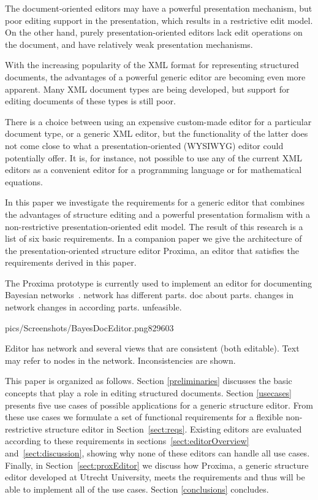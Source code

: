 \documentclass{speauth}
\begin{document}

The document-oriented editors may have a powerful presentation mechanism, but poor editing support in the presentation, which results in a restrictive edit model. On the other hand,  purely presentation-oriented editors lack edit operations on the document, and have relatively weak presentation mechanisms.

With the increasing popularity of the XML format for representing structured documents, the advantages of a powerful generic editor are becoming even more apparent. Many XML document types are being developed, but support for editing documents of these types is still poor. 

There is a choice between using an expensive custom-made editor for a particular document type, or a generic XML editor, but the functionality of the latter does not come close to what a presentation-oriented (WYSIWYG) editor could potentially offer. It is, for instance, not possible to use any of the current XML editors as a convenient editor for a programming language or for mathematical equations.

In this paper we investigate the requirements for a generic editor that combines the advantages of structure editing and a powerful presentation formalism with a non-restrictive presentation-oriented edit model. The result of this research is a list of six basic requirements. In a companion paper we give the architecture of the presentation-oriented structure editor Proxima, an editor that satisfies  the requirements derived in this paper.

The Proxima prototype is currently used to implement an editor for documenting Bayesian networks~\cite{Jensen2001BayesianNetworks}. 
network has different parts. doc about parts. changes in network changes in according parts. unfeasible.



          {pics/Screenshots/BayesDocEditor.png}{829}{603}





Editor has network and several views that are consistent (both editable). Text may refer to nodes in the network. Inconsistencies are shown.



This paper is organized as follows. Section \ref{preliminaries} discusses the basic concepts that play a role in editing structured documents. Section \ref{usecases} presents five use cases of possible applications for a generic structure editor. From these use cases we formulate a set of functional requirements for a flexible non-restrictive structure editor in Section~\ref{sect:reqs}. Existing editors are evaluated according to these requirements in sections~\ref{sect:editorOverview} and~\ref{sect:discussion}, showing why none of these editors can handle all use cases. Finally, in Section~\ref{sect:proxEditor} we discuss how Proxima, a generic structure editor developed at Utrecht University, meets the requirements and thus will be able to implement all of the use cases. Section \ref{conclusions} concludes.
\end{document}
